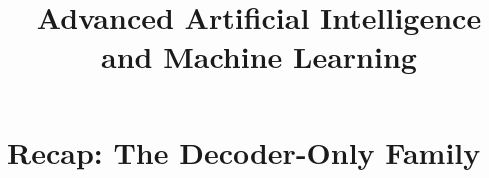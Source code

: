 




\newcommand{\ques}{\textbf{\textcolor{red}{Question:  }}}
\newcommand{\myblue}[1]{\textcolor{blue}{#1}}
\newcommand{\citebutton}[2]{\beamergotobutton{\href{#2}{#1}}}
\newcommand\warning{%
 \makebox[1.4em][c]{%
 \makebox[0pt][c]{\raisebox{.1em}{\scriptsize!}}%
 \makebox[0pt][c]{\color{red}\normalsize$\bigtriangleup$}}}%

\newcommand{\titlefigure}{figure/twotypesoflearning.png}
\newcommand{\learninggoals}{
  \item Complete the three-Transformer-families taxonomy: GPT-1 $\to$ GPT-2 $\to$ GPT-3 as the decoder-only flagship, and how the recipe scaled into in-context learning
  \item Precise terminology for fine-tuning and prompting: single-task, multi-task, few-shot, instruction tuning
  \item Chain-of-thought reasoning and why bigger models reason better -- and DeepSeek-R1, where reasoning is trained via automatic, verifiable rewards instead
  \item What it actually costs to train an LLM: compute, memory, distributed training, FlashAttention
  \item Scaling laws: Kaplan vs.\ Chinchilla, and whether scaling has plateaued
}

\title{Advanced Artificial Intelligence and Machine Learning}
\date{}




\section{Recap: The Decoder-Only Family}

